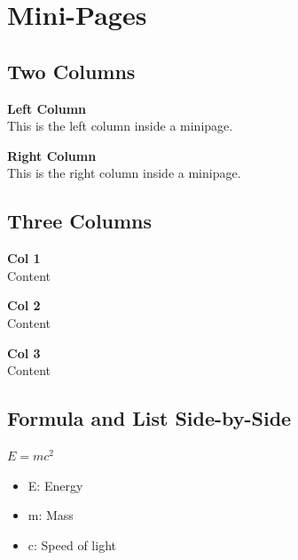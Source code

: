 \begingroup
\raggedright
\section{Mini-Pages}


\subsection{Two Columns}
\begin{minipage}{0.45\linewidth}
    \textbf{Left Column} \\
    This is the left column inside a minipage.
\end{minipage}
\hfill
\begin{minipage}{0.45\linewidth}
    \textbf{Right Column} \\
    This is the right column inside a minipage.
\end{minipage}


\subsection{Three Columns}
\begin{minipage}{0.3\linewidth}
    \textbf{Col 1} \\
    Content
\end{minipage}
\hfill
\begin{minipage}{0.3\linewidth}
    \textbf{Col 2} \\
    Content
\end{minipage}
\hfill
\begin{minipage}{0.3\linewidth}
    \textbf{Col 3} \\
    Content
\end{minipage}


\subsection{Formula and List Side-by-Side}
\begin{minipage}[t]{0.5\linewidth}
    \begin{formulabox}
        $E = mc^2$
    \end{formulabox}
\end{minipage}\hfill
\begin{minipage}[t]{0.45\linewidth}
    \begin{itemize}
        \item E: Energy
        \item m: Mass
        \item c: Speed of light
    \end{itemize}
\end{minipage}


